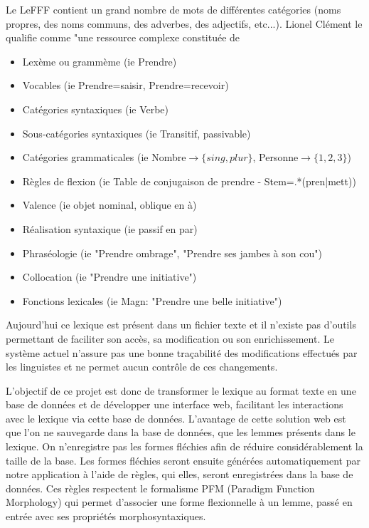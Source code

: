 \documentclass[12pt,a4paper]{article}
\begin{document}
Le LeFFF contient un grand nombre de mots de différentes catégories (noms propres, des noms communs, des adverbes, des adjectifs, etc...).
Lionel Clément le qualifie comme "une ressource complexe constituée de
\begin{itemize}
\item Lexème ou grammème (ie Prendre)
\item Vocables (ie Prendre=saisir, Prendre=recevoir)
\item Catégories syntaxiques (ie Verbe)
\item Sous-catégories syntaxiques (ie Transitif, passivable)
\item Catégories grammaticales (ie Nombre$\rightarrow\{sing, plur\}$, Personne$\rightarrow\{1, 2, 3\}$)
\item Règles de flexion (ie Table de conjugaison de prendre - Stem=.*(pren|mett))
\item Valence (ie objet nominal, oblique en à)
\item Réalisation syntaxique (ie passif en par)
\item Phraséologie (ie "Prendre ombrage", "Prendre ses jambes à son cou")
\item Collocation (ie "Prendre une initiative")
\item Fonctions lexicales (ie Magn: "Prendre une belle initiative")
\end{itemize}

\smallbreak Aujourd'hui ce lexique est présent dans un fichier texte et il n'existe pas d'outils permettant de faciliter son accès, sa modification ou son enrichissement.
Le système actuel n'assure pas une bonne traçabilité des modifications effectués par les linguistes et ne permet aucun contrôle de ces changements. 

L'objectif de ce projet est donc de transformer le lexique au format texte en une base de données et de développer une interface web, facilitant les interactions avec le lexique via cette base de données.
L'avantage de cette solution web est que l'on ne sauvegarde dans la base de données, que les lemmes présents dans le lexique. On n'enregistre pas les formes fléchies afin de réduire considérablement la taille de la base.
Les formes fléchies seront ensuite générées automatiquement par notre application à l'aide de règles, qui elles, seront enregistrées dans la base de données.
Ces règles respectent le formalisme PFM (Paradigm Function Morphology) qui permet d'associer une forme flexionnelle à un lemme, passé en entrée avec ses propriétés morphosyntaxiques.
\end{document}
